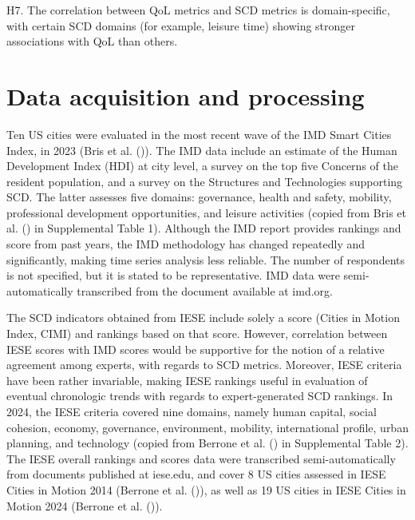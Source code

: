 \documentclass[
  english,
  12pt,
  a4paper,
]{scrartcl}
\begin{document}
H7. The correlation between QoL metrics and SCD metrics is
domain-specific, with certain SCD domains (for example, leisure time)
showing stronger associations with QoL than others.

\section{Data acquisition and
processing}\label{data-acquisition-and-processing}

Ten US cities were evaluated in the most recent wave of the IMD Smart
Cities Index, in 2023 (Bris et al.
()). The IMD data include an
estimate of the Human Development Index (HDI) at city level, a survey on
the top five Concerns of the resident population, and a survey on the
Structures and Technologies supporting SCD. The latter assesses five
domains: governance, health and safety, mobility, professional
development opportunities, and leisure activities (copied from Bris et
al. () in Supplemental Table
1). Although the IMD report provides rankings and score from past years,
the IMD methodology has changed repeatedly and significantly, making
time series analysis less reliable. The number of respondents is not
specified, but it is stated to be representative. IMD data were
semi-automatically transcribed from the document available at imd.org.

The SCD indicators obtained from IESE include solely a score (Cities in
Motion Index, CIMI) and rankings based on that score. However,
correlation between IESE scores with IMD scores would be supportive for
the notion of a relative agreement among experts, with regards to SCD
metrics. Moreover, IESE criteria have been rather invariable, making
IESE rankings useful in evaluation of eventual chronologic trends with
regards to expert-generated SCD rankings. In 2024, the IESE criteria
covered nine domains, namely human capital, social cohesion, economy,
governance, environment, mobility, international profile, urban
planning, and technology (copied from Berrone et al.
() in Supplemental Table
2). The IESE overall rankings and scores data were transcribed
semi-automatically from documents published at iese.edu, and cover 8 US
cities assessed in IESE Cities in Motion 2014 (Berrone et al.
()), as well as 19 US
cities in IESE Cities in Motion 2024 (Berrone et al.
()).
\end{document}
